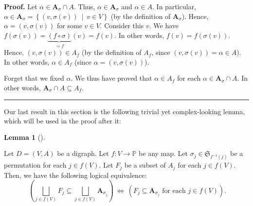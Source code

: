 \documentclass[numbers=enddot,12pt,final,onecolumn,notitlepage]{scrartcl}%
\numberwithin{exer}{section}
\theoremstyle{definition}
\newtheorem{lem}[theo]{Lemma}
\newenvironment{lemma}[1][]
{\begin{lem}[#1]\begin{leftbar}}
{\end{leftbar}\end{lem}}
\newenvironment{proof}[1][Proof]{\noindent\textbf{#1.} }{\ \rule{0.5em}{0.5em}}
\let\sqcupnonlimits\bigsqcup
\renewcommand{\bigsqcup}{\sqcupnonlimits\limits}
\newenvironment{verlong}{}{}
\begin{document}
\begin{verlong}


\begin{proof}
Let $\alpha\in\mathbf{A}_{\sigma}\cap A$. Thus, $\alpha\in\mathbf{A}_{\sigma}$
and $\alpha\in A$. In particular, $\alpha\in\mathbf{A}_{\sigma}=\left\{
\left(  v,\sigma\left(  v\right)  \right)  \ \mid\ v\in V\right\}  $ (by the
definition of $\mathbf{A}_{\sigma}$). Hence, $\alpha=\left(  v,\sigma\left(
v\right)  \right)  $ for some $v\in V$. Consider this $v$. We have $f\left(
\sigma\left(  v\right)  \right)  =\underbrace{\left(  f\circ\sigma\right)
}_{=f}\left(  v\right)  =f\left(  v\right)  $. In other words, $f\left(
v\right)  =f\left(  \sigma\left(  v\right)  \right)  $. Hence, $\left(
v,\sigma\left(  v\right)  \right)  \in A_{f}$ (by the definition of $A_{f}$,
since $\left(  v,\sigma\left(  v\right)  \right)  =\alpha\in A$). In other
words, $\alpha\in A_{f}$ (since $\alpha=\left(  v,\sigma\left(  v\right)
\right)  $).

Forget that we fixed $\alpha$. We thus have proved that $\alpha\in A_{f}$ for
each $\alpha\in\mathbf{A}_{\sigma}\cap A$. In other words, $\mathbf{A}%
_{\sigma}\cap A\subseteq A_{f}$.
\end{proof}
\end{verlong}

Our last result in this section is the following trivial yet complex-looking
lemma, which will be used in the proof after it:

\begin{lemma}
\label{lem.level.djunex}Let $D=\left(  V,A\right)  $ be a digraph. Let
$f:V\rightarrow\mathbb{P}$ be any map. Let $\sigma_{j}\in\mathfrak{S}%
_{f^{-1}\left(  j\right)  }$ be a permutation for each $j\in f\left(
V\right)  $. Let $F_{j}$ be a subset of $A_{j}$ for each $j\in f\left(
V\right)  $. Then, we have the following logical equivalence:%
\[
\ \left(  \bigsqcup_{j\in f\left(  V\right)  }F_{j}\subseteq\bigsqcup_{j\in
f\left(  V\right)  }\mathbf{A}_{\sigma_{j}}\right)  \ \Longleftrightarrow
\ \left(  F_{j}\subseteq\mathbf{A}_{\sigma_{j}}\text{ for each }j\in f\left(
V\right)  \right)  .
\]

\end{lemma}
\end{document}
